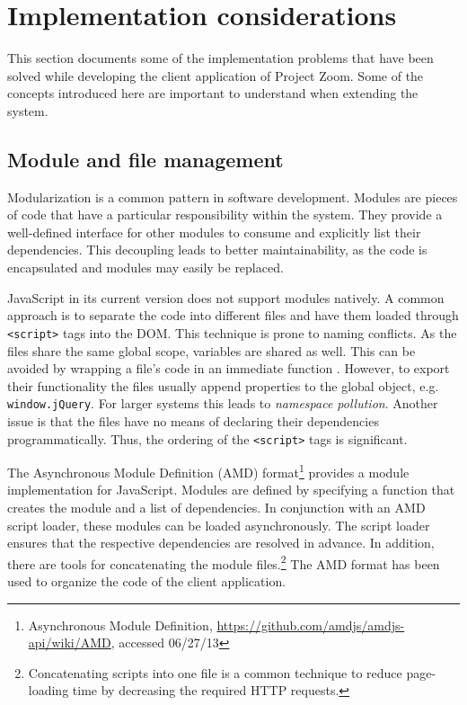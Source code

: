 \chapter{Implementation considerations}

This section documents some of the implementation problems that have been solved while developing the client application of Project Zoom. Some of the concepts introduced here are important to understand when extending the system. 

\section{Module and file management}
Modularization is a common pattern in software development. Modules are pieces of code that have a particular responsibility within the system. They provide a well-defined interface for other modules to consume and explicitly list their dependencies. This decoupling leads to better maintainability, as the code is encapsulated and modules may easily be replaced. \cite{Osmani_2011}

JavaScript in its current version does not support modules natively. A common approach is to separate the code into different files and have them loaded through \texttt{<script>} tags into the DOM. This technique is prone to naming conflicts. As the files share the same global scope, variables are shared as well. This can be avoided by wrapping a file's code in an immediate function \cite{Resig_2013}. However, to export their functionality the files usually append properties to the global object, e.g. \texttt{window.jQuery}. For larger systems this leads to \textit{namespace pollution}. Another issue is that the files have no means of declaring their dependencies programmatically. Thus, the ordering of the \texttt{<script>} tags is significant.

The Asynchronous Module Definition (AMD) format\footnote{Asynchronous Module Definition, \url{https://github.com/amdjs/amdjs-api/wiki/AMD}, accessed 06/27/13} provides a module implementation for Ja\-va\-Script. Modules are defined by specifying a function that creates the module and a list of dependencies. In conjunction with an AMD script loader, these modules can be loaded asynchronously. The script loader ensures that the respective dependencies are resolved in advance. In addition, there are tools for concatenating the module files.\footnote{Concatenating scripts into one file is a common technique to reduce page-loading time by decreasing the required HTTP requests.} The AMD format has been used to organize the code of the client application.

